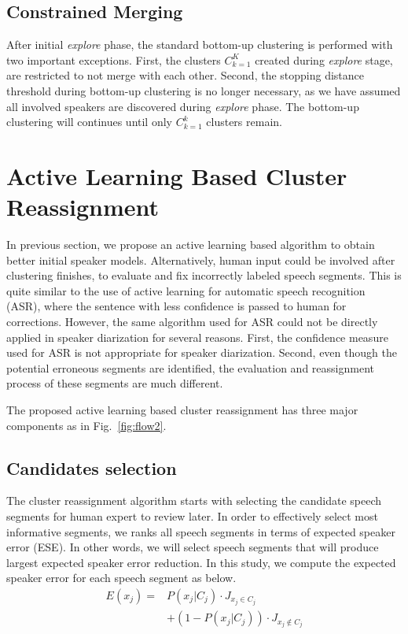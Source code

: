\documentclass[journal]{IEEEtran}
\begin{document}
\subsection{Constrained Merging}
After initial \textit{explore} phase, the standard bottom-up clustering is performed with two important exceptions. First, the clusters $C_{k=1}^{K}$ created during \textit{explore} stage, are restricted to not merge with each other. Second, the stopping distance threshold during bottom-up clustering is no longer necessary, as we have assumed all involved speakers are discovered during \textit{explore} phase. The bottom-up clustering will continues until only $C_{k=1}^{k}$ clusters remain.

\section{Active Learning Based Cluster Reassignment}
In previous section, we propose an active learning based algorithm to obtain better initial speaker models. Alternatively, human input could be involved after clustering finishes, to evaluate and fix incorrectly labeled speech segments. This is quite similar to the use of active learning for automatic speech recognition (ASR), where the sentence with less confidence is passed to human for corrections. However, the same algorithm used for ASR could not be directly applied in speaker diarization for several reasons. First, the confidence measure used for ASR is not appropriate for speaker diarization. Second, even though the potential erroneous segments are identified, the evaluation and reassignment process of these segments are much different.

The proposed active learning based cluster reassignment has three major components as in Fig.~\ref{fig:flow2}. 

\subsection{Candidates selection}
The cluster reassignment algorithm starts with selecting the candidate speech segments for human expert to review later. In order to effectively select most informative segments, we ranks all speech segments in terms of expected speaker error (ESE). In other words, we will select speech segments that will produce largest expected speaker error reduction. 
In this study, we compute the expected speaker error for each speech segment as below. 
\begin{equation}
\begin{aligned}
E(x_j) =& P(x_j | C_j) \cdot J_{x_j \in C_j} \\
&+ (1 - P(x_j | C_j)) \cdot J_{x_j \notin C_j}
\label{expect}
\end{aligned}
\end{equation}
\end{document}
